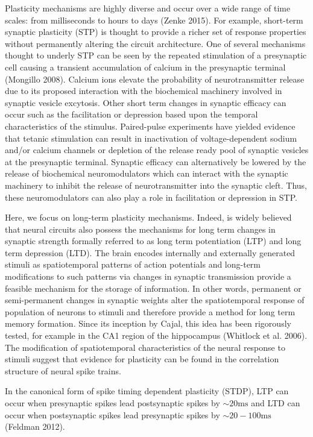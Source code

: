 \documentclass{ucetd}
\begin{document}
Plasticity mechanisms are highly diverse and occur over a wide range of time scales: from milliseconds to hours to days (Zenke 2015). For example, short-term synaptic plasticity (STP) is thought to provide a richer set of response properties without permanently altering the circuit architecture. One of several mechanisms thought to underly STP can be seen by the repeated stimulation of a presynaptic cell causing a transient accumulation of calcium in the presynaptic terminal (Mongillo 2008). Calcium ions elevate the probability of neurotransmitter release due to its proposed interaction with the biochemical machinery involved in synaptic vesicle excytosis. Other short term changes in synaptic efficacy can occur such as the facilitation or depression based upon the temporal characteristics of the stimulus. Paired-pulse experiments have yielded evidence that tetanic stimulation can result in inactivation of voltage-dependent sodium and/or calcium channels or depletion of the release ready pool of synaptic vesicles at the presynaptic terminal. Synaptic efficacy can alternatively be lowered by the release of biochemical neuromodulators which can interact with the synaptic machinery to inhibit the release of neurotransmitter into the synaptic cleft. Thus, these neuromodulators can also play a role in facilitation or depression in STP.

Here, we focus on long-term plasticity mechanisms. Indeed, is widely believed that neural circuits also possess the mechanisms for long term changes in synaptic strength formally referred to as long term potentiation (LTP) and long term depression (LTD). The brain encodes internally and externally generated stimuli as spatiotemporal patterns of action potentials and long-term modifications to such patterns via changes in synaptic transmission provide a feasible mechanism for the storage of information. In other words, permanent or semi-permanent changes in synaptic weights alter the spatiotemporal response of population of neurons to stimuli and therefore provide a method for long term memory formation. Since its inception by Cajal, this idea has been rigorously tested, for example in the CA1 region of the hippocampus (Whitlock et al. 2006). The modification of spatiotemporal characteristics of the neural response to stimuli suggest that evidence for plasticity can be found in the correlation structure of neural spike trains.

In the canonical form of spike timing dependent plasticity (STDP), LTP can occur when presynaptic spikes lead postsynaptic spikes by $\sim 20\mathrm{ms}$ and LTD can occur when postsynaptic spikes lead presynaptic spikes by $\sim 20-100\mathrm{ms}$ (Feldman 2012). 
\end{document}
